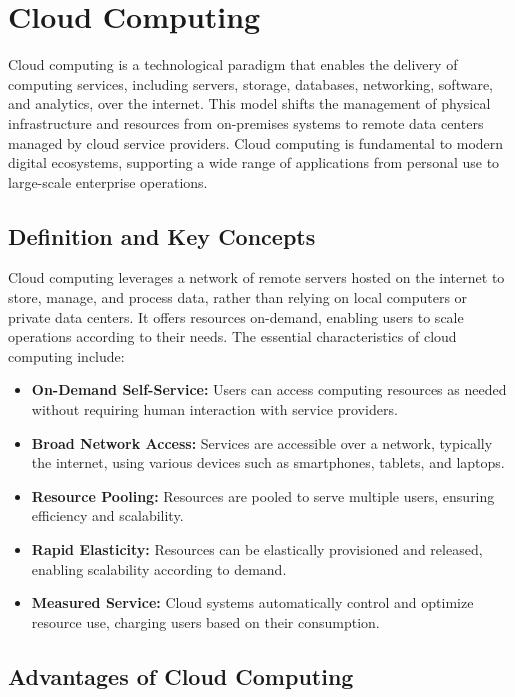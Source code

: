 \chapter{Cloud Computing}\label{ch:cloud_computing}

Cloud computing is a technological paradigm that enables the delivery of computing services, including servers, storage, databases, networking, software, and analytics, over the internet. This model shifts the management of physical infrastructure and resources from on-premises systems to remote data centers managed by cloud service providers. Cloud computing is fundamental to modern digital ecosystems, supporting a wide range of applications from personal use to large-scale enterprise operations.

\section{Definition and Key Concepts}

Cloud computing leverages a network of remote servers hosted on the internet to store, manage, and process data, rather than relying on local computers or private data centers. It offers resources on-demand, enabling users to scale operations according to their needs. The essential characteristics of cloud computing include:

\begin{itemize}
	\item \textbf{On-Demand Self-Service:} Users can access computing resources as needed without requiring human interaction with service providers.
	\item \textbf{Broad Network Access:} Services are accessible over a network, typically the internet, using various devices such as smartphones, tablets, and laptops.
	\item \textbf{Resource Pooling:} Resources are pooled to serve multiple users, ensuring efficiency and scalability.
	\item \textbf{Rapid Elasticity:} Resources can be elastically provisioned and released, enabling scalability according to demand.
	\item \textbf{Measured Service:} Cloud systems automatically control and optimize resource use, charging users based on their consumption.
\end{itemize}

\section{Advantages of Cloud Computing}

